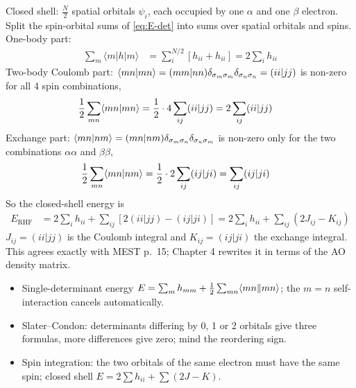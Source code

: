 Closed shell: $\frac{N}{2}$ spatial orbitals $\psi_i$, each occupied by one $\alpha$ and one $\beta$ electron. Split the spin-orbital sums of \eqref{eq:E-det} into sums over spatial orbitals and spins. One-body part:
\begin{align*}
\sum_m \langle m|h|m\rangle &= \sum_{i}^{N/2} [h_{ii} + h_{ii}] = 2 \sum_i h_{ii}
\end{align*}
Two-body Coulomb part: $\langle mn\vert mn\rangle = (mm|nn) \delta_{\sigma_m \sigma_m} \delta_{\sigma_n \sigma_n} = (ii|jj)$ is non-zero for all 4 spin combinations,
\begin{align*}
\frac{1}{2} \sum_{mn} \langle mn\vert mn\rangle &= \frac{1}{2} \cdot 4 \sum_{ij} (ii|jj) = 2 \sum_{ij} (ii|jj)
\end{align*}
Exchange part: $\langle mn\vert nm\rangle = (mn|nm) \delta_{\sigma_m \sigma_n} \delta_{\sigma_n \sigma_m}$ is non-zero only for the two combinations $\alpha \alpha$ and $\beta \beta$,
\begin{align*}
\frac{1}{2} \sum_{mn} \langle mn\vert nm\rangle &= \frac{1}{2} \cdot 2 \sum_{ij} (ij|ji) = \sum_{ij} (ij|ji)
\end{align*}
So the closed-shell energy is
\begin{align}\label{eq:E-rhf-mo}
E_{\text{RHF}} &= 2 \sum_i h_{ii} + \sum_{ij} [2 (ii|jj) - (ij|ji)] = 2 \sum_i h_{ii} + \sum_{ij} (2 J_{ij} - K_{ij})
\end{align}
$J_{ij} = (ii|jj)$ is the Coulomb integral and $K_{ij} = (ij|ji)$ the exchange integral. This agrees exactly with MEST p.~15; Chapter 4 rewrites it in terms of the AO density matrix.

\begin{summary}
\begin{itemize}
\item Single-determinant energy $E = \sum_m h_{mm} + \frac{1}{2} \sum_{mn} \langle mn\Vert mn\rangle$; the $m = n$ self-interaction cancels automatically.
\item Slater--Condon: determinants differing by 0, 1 or 2 orbitals give three formulas, more differences give zero; mind the reordering sign.
\item Spin integration: the two orbitals of the same electron must have the same spin; closed shell $E = 2 \sum h_{ii} + \sum (2J - K)$.
\end{itemize}
\end{summary}
